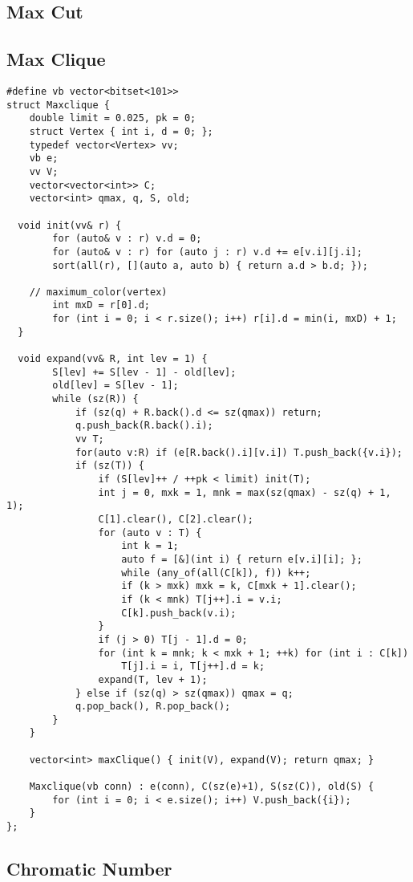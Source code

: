 \newpage
\subsection{Max Cut}

\subsection{Max Clique}

\begin{lstlisting}
#define vb vector<bitset<101>>
struct Maxclique {
	double limit = 0.025, pk = 0;
	struct Vertex { int i, d = 0; };
	typedef vector<Vertex> vv;
	vb e;
	vv V;
	vector<vector<int>> C;
	vector<int> qmax, q, S, old;
	
  void init(vv& r) {
		for (auto& v : r) v.d = 0;
		for (auto& v : r) for (auto j : r) v.d += e[v.i][j.i];
		sort(all(r), [](auto a, auto b) { return a.d > b.d; });

    // maximum_color(vertex)
		int mxD = r[0].d;
		for (int i = 0; i < r.size(); i++) r[i].d = min(i, mxD) + 1;
  }
	
  void expand(vv& R, int lev = 1) {
		S[lev] += S[lev - 1] - old[lev];
		old[lev] = S[lev - 1];
		while (sz(R)) {
			if (sz(q) + R.back().d <= sz(qmax)) return;
			q.push_back(R.back().i);
			vv T;
			for(auto v:R) if (e[R.back().i][v.i]) T.push_back({v.i});
			if (sz(T)) {
				if (S[lev]++ / ++pk < limit) init(T);
				int j = 0, mxk = 1, mnk = max(sz(qmax) - sz(q) + 1, 1);
				C[1].clear(), C[2].clear();
				for (auto v : T) {
					int k = 1;
					auto f = [&](int i) { return e[v.i][i]; };
					while (any_of(all(C[k]), f)) k++;
					if (k > mxk) mxk = k, C[mxk + 1].clear();
					if (k < mnk) T[j++].i = v.i;
					C[k].push_back(v.i);
				}
				if (j > 0) T[j - 1].d = 0;
				for (int k = mnk; k < mxk + 1; ++k) for (int i : C[k])
					T[j].i = i, T[j++].d = k;
				expand(T, lev + 1);
			} else if (sz(q) > sz(qmax)) qmax = q;
			q.pop_back(), R.pop_back();
		}
	}

	vector<int> maxClique() { init(V), expand(V); return qmax; }

	Maxclique(vb conn) : e(conn), C(sz(e)+1), S(sz(C)), old(S) {
		for (int i = 0; i < e.size(); i++) V.push_back({i});
	}
};

\end{lstlisting}

\newpage

\subsection{Chromatic Number}

